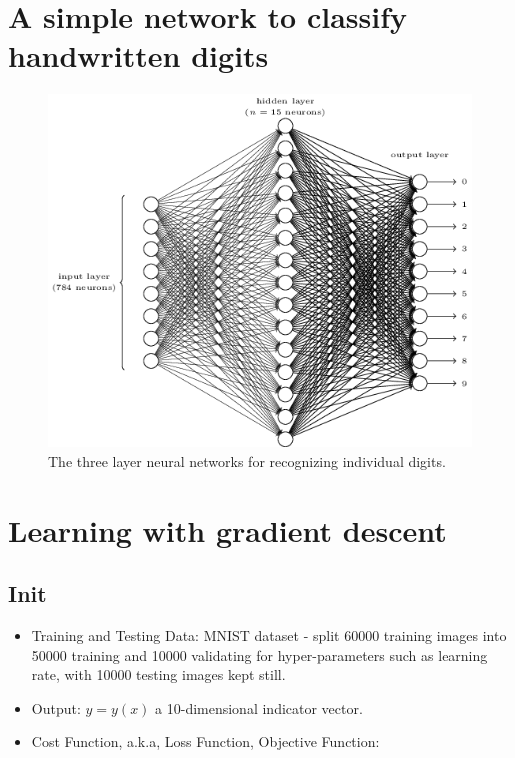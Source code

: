\documentclass[]{book}
\begin{document}
\section{A simple network to classify handwritten
digits}\label{a-simple-network-to-classify-handwritten-digits}

\begin{figure}

{\centering \includegraphics[width=0.7\linewidth]{fig/01_tikz12} 

}

\caption{The three layer neural networks for recognizing individual digits.}\label{fig:nnhd-nn-digit}
\end{figure}

\section{Learning with gradient
descent}\label{learning-with-gradient-descent}

\subsection{Init}\label{init}

\begin{itemize}
\item
  Training and Testing Data: MNIST dataset - split 60000 training images
  into 50000 training and 10000 validating for hyper-parameters such as
  learning rate, with 10000 testing images kept still.
\item
  Output: \(y = y(x)\) a 10-dimensional indicator vector.
\item
  Cost Function, a.k.a, Loss Function, Objective Function:
\end{itemize}
\end{document}
